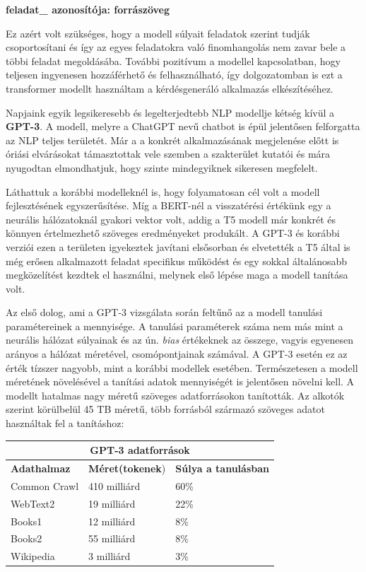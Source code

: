 \textbf{feladat\_ azonosítója: forrászöveg}

Ez azért volt szükséges, hogy a modell súlyait feladatok szerint tudják csoportosítani és így az egyes feladatokra való finomhangolás nem zavar bele a többi feladat megoldásába. További pozitívum a modellel kapcsolatban, hogy teljesen ingyenesen hozzáférhető és felhasználható, így dolgozatomban is ezt a transformer modellt használtam a kérdésgeneráló alkalmazás elkészítéséhez.


Napjaink egyik legsikeresebb és legelterjedtebb NLP modellje kétség kívül a \textbf{GPT-3}. A modell, melyre a ChatGPT nevű chatbot is épül jelentősen felforgatta az NLP teljes területét. Már a a konkrét alkalmazásának megjelenése előtt is óriási elvárásokat támasztottak vele szemben a szakterület kutatói és mára nyugodtan elmondhatjuk, hogy szinte mindegyiknek sikeresen megfelelt.

Láthattuk a korábbi modelleknél is, hogy folyamatosan cél volt a modell fejlesztésének egyszerűsítése. Míg a BERT-nél a visszatérési értékünk egy a neurális hálózatoknál gyakori vektor volt, addig a T5 modell már konkrét és könnyen értelmezhető szöveges eredményeket produkált. A GPT-3 és korábbi verziói ezen a területen igyekeztek javítani elsősorban és elvetették a T5 által is még erősen alkalmazott feladat specifikus működést és egy sokkal általánosabb megközelítést kezdtek el használni, melynek első lépése maga a modell tanítása volt. 

Az első dolog, ami a GPT-3 vizsgálata során feltűnő az a modell tanulási paramétereinek a mennyisége. A tanulási paraméterek száma nem más mint a neurális hálózat súlyainak és az ún. \textit{bias} értékeknek az összege, vagyis egyenesen arányos a hálózat méretével, csomópontjainak számával. A GPT-3 esetén ez az érték tízszer nagyobb, mint a korábbi modellek esetében. Természetesen a modell méretének növelésével a tanítási adatok mennyiségét is jelentősen növelni kell. A modellt hatalmas nagy méretű szöveges adatforrásokon tanították. Az alkotók szerint\cite{gpt} körülbelül 45 TB méretű, több forrásból származó szöveges adatot használtak fel a tanításhoz:

\begin{center}
\begin{tabular}{ |p{4cm}|p{4cm}|p{4cm}|  }
\hline
\multicolumn{3}{|c|}{GPT-3 adatforrások} \\
\hline
\textbf{Adathalmaz} & \textbf{Méret(tokenek}) & \textbf{Súlya a tanulásban} \\
\hline
Common Crawl & 410 milliárd & 60\% \\
WebText2 & 19 milliárd & 22\% \\
Books1 & 12 milliárd & 8\% \\
Books2 & 55 milliárd & 8\% \\
Wikipedia & 3 milliárd & 3\% \\
\hline
\end{tabular}
\end{center}

